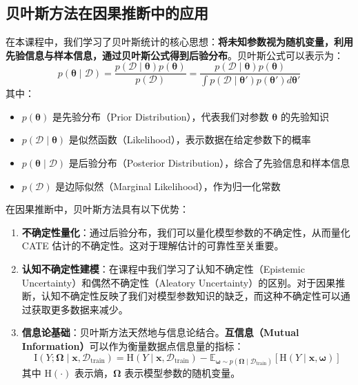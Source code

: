\documentclass[12pt]{article}
\begin{document}
\subsection{贝叶斯方法在因果推断中的应用}

在本课程中，我们学习了贝叶斯统计的核心思想：\textbf{将未知参数视为随机变量，利用先验信息与样本信息，通过贝叶斯公式得到后验分布}。贝叶斯公式可以表示为：
\begin{equation}
p(\boldsymbol{\theta} \mid \mathcal{D}) = \frac{p(\mathcal{D} \mid \boldsymbol{\theta}) p(\boldsymbol{\theta})}{p(\mathcal{D})} = \frac{p(\mathcal{D} \mid \boldsymbol{\theta}) p(\boldsymbol{\theta})}{\int p(\mathcal{D} \mid \boldsymbol{\theta}') p(\boldsymbol{\theta}') d\boldsymbol{\theta}'}
\end{equation}
其中：
\begin{itemize}
\item $p(\boldsymbol{\theta})$ 是先验分布（Prior Distribution），代表我们对参数 $\boldsymbol{\theta}$ 的先验知识
\item $p(\mathcal{D} \mid \boldsymbol{\theta})$ 是似然函数（Likelihood），表示数据在给定参数下的概率
\item $p(\boldsymbol{\theta} \mid \mathcal{D})$ 是后验分布（Posterior Distribution），综合了先验信息和样本信息
\item $p(\mathcal{D})$ 是边际似然（Marginal Likelihood），作为归一化常数
\end{itemize}

在因果推断中，贝叶斯方法具有以下优势：

\begin{enumerate}
\item \textbf{不确定性量化}：通过后验分布，我们可以量化模型参数的不确定性，从而量化 CATE 估计的不确定性。这对于理解估计的可靠性至关重要。

\item \textbf{认知不确定性建模}：在课程中我们学习了认知不确定性（Epistemic Uncertainty）和偶然不确定性（Aleatory Uncertainty）的区别。对于因果推断，认知不确定性反映了我们对模型参数知识的缺乏，而这种不确定性可以通过获取更多数据来减少。

\item \textbf{信息论基础}：贝叶斯方法天然地与信息论结合。\textbf{互信息（Mutual Information）}可以作为衡量数据点信息量的指标：
\begin{equation}
\text{I}(Y; \boldsymbol{\Omega} \mid \mathbf{x}, \mathcal{D}_{\text{train}}) = \text{H}(Y \mid \mathbf{x}, \mathcal{D}_{\text{train}}) - \mathbb{E}_{\boldsymbol{\omega} \sim p(\boldsymbol{\Omega} \mid \mathcal{D}_{\text{train}})}[\text{H}(Y \mid \mathbf{x}, \boldsymbol{\omega})]
\end{equation}
其中 $\text{H}(\cdot)$ 表示熵，$\boldsymbol{\Omega}$ 表示模型参数的随机变量。
\end{enumerate}
\end{document}
